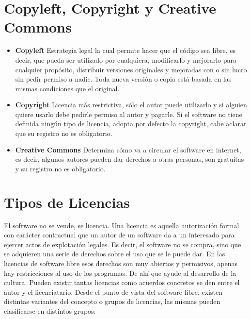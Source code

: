 \section {Copyleft, Copyright y Creative Commons}
\begin{itemize}
\item {\bf Copyleft}
Estrategia legal la cual permite hacer que el código sea libre, es decir, que pueda ser utilizado por cualquiera, modificarlo y mejorarlo para cualquier propósito, distribuir versiones originales y mejoradas con o sin lucro sin pedir permiso a nadie. Toda nueva versión o copia está basada en las mismas condiciones que el original.
\item {\bf Copyright}
Licencia más restrictiva, sólo el autor puede utilizarlo y si alguien quiere usarlo debe pedirle permiso al autor y pagarle. Si el software no tiene definida ningún tipo de licencia, adopta por defecto la copyright, cabe aclarar que su registro no es obligatorio. 
\item {\bf Creative Commons}
Determina cómo va a circular el software en internet, es decir, algunos autores pueden dar derechos a otras personas, son gratuitas y su registro no es obligatorio.
\end{itemize}

\section {Tipos de Licencias}
El software no se vende, se licencia. Una licencia es aquella autorización formal con carácter contractual que un autor de un software da a un interesado para ejercer actos de explotación legales. Es decir, el software no se compra, sino que se adquieren una serie de derechos sobre el uso que se le puede dar. En las licencias de software libre esos derechos son muy abiertos y permisivos, apenas hay restricciones al uso de los programas. De ahí que ayude al desarrollo de la cultura. Pueden existir tantas licencias como acuerdos concretos se den entre el autor y el licenciatario. Desde el punto de vista del software libre, existen distintas variantes del concepto o grupos de licencias, las mismas pueden clasificarse en distintos grupos:\\

